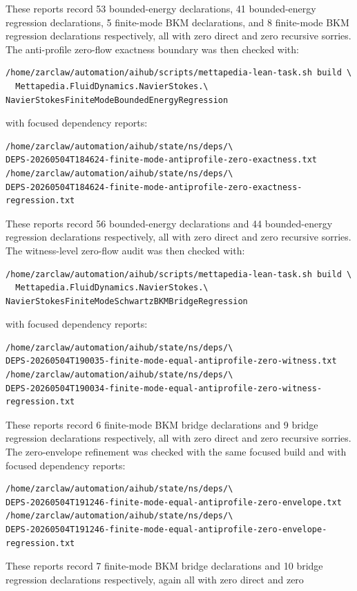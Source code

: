 \documentclass[11pt]{article}
\begin{document}
These reports record 53 bounded-energy declarations, 41 bounded-energy
regression declarations, 5 finite-mode BKM declarations, and 8 finite-mode BKM
regression declarations respectively, all with zero direct and zero recursive
sorries.
The anti-profile zero-flow exactness boundary was then checked with:
\begin{verbatim}
/home/zarclaw/automation/aihub/scripts/mettapedia-lean-task.sh build \
  Mettapedia.FluidDynamics.NavierStokes.\
NavierStokesFiniteModeBoundedEnergyRegression
\end{verbatim}
with focused dependency reports:
\begin{verbatim}
/home/zarclaw/automation/aihub/state/ns/deps/\
DEPS-20260504T184624-finite-mode-antiprofile-zero-exactness.txt
/home/zarclaw/automation/aihub/state/ns/deps/\
DEPS-20260504T184624-finite-mode-antiprofile-zero-exactness-regression.txt
\end{verbatim}
These reports record 56 bounded-energy declarations and 44 bounded-energy
regression declarations respectively, all with zero direct and zero recursive
sorries.
The witness-level zero-flow audit was then checked with:
\begin{verbatim}
/home/zarclaw/automation/aihub/scripts/mettapedia-lean-task.sh build \
  Mettapedia.FluidDynamics.NavierStokes.\
NavierStokesFiniteModeSchwartzBKMBridgeRegression
\end{verbatim}
with focused dependency reports:
\begin{verbatim}
/home/zarclaw/automation/aihub/state/ns/deps/\
DEPS-20260504T190035-finite-mode-equal-antiprofile-zero-witness.txt
/home/zarclaw/automation/aihub/state/ns/deps/\
DEPS-20260504T190034-finite-mode-equal-antiprofile-zero-witness-regression.txt
\end{verbatim}
These reports record 6 finite-mode BKM bridge declarations and 9 bridge
regression declarations respectively, all with zero direct and zero recursive
sorries.
The zero-envelope refinement was checked with the same focused build and with
focused dependency reports:
\begin{verbatim}
/home/zarclaw/automation/aihub/state/ns/deps/\
DEPS-20260504T191246-finite-mode-equal-antiprofile-zero-envelope.txt
/home/zarclaw/automation/aihub/state/ns/deps/\
DEPS-20260504T191246-finite-mode-equal-antiprofile-zero-envelope-regression.txt
\end{verbatim}
These reports record 7 finite-mode BKM bridge declarations and 10 bridge
regression declarations respectively, again all with zero direct and zero
\end{document}
